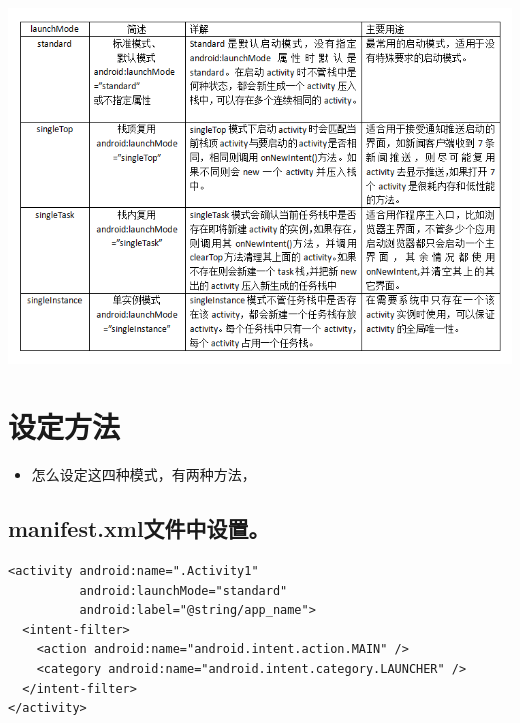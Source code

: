 \documentclass[9pt, b5paaper]{book}
\begin{document}
\includegraphics[width=.9\linewidth]{./pic/launchmode.png}

\section{设定方法}
\label{sec-4-6}
\begin{itemize}
\item 怎么设定这四种模式，有两种方法，
\end{itemize}
\subsection{manifest.xml文件中设置。}
\label{sec-4-6-1}
\begin{verbatim}
<activity android:name=".Activity1" 
          android:launchMode="standard" 
          android:label="@string/app_name"> 
  <intent-filter> 
    <action android:name="android.intent.action.MAIN" /> 
    <category android:name="android.intent.category.LAUNCHER" /> 
  </intent-filter> 
</activity>
\end{verbatim}
\end{document}
